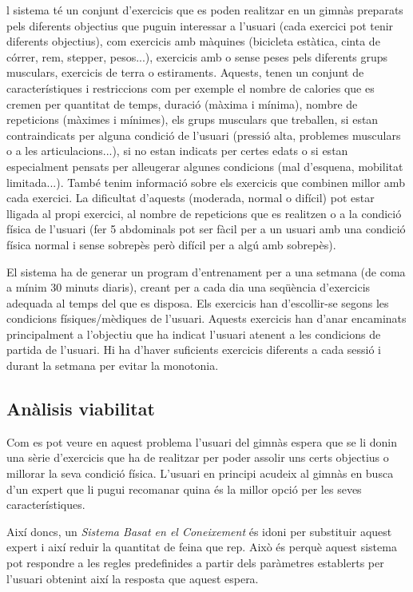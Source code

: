\documentclass[a4paper, 12pt]{article}
\begin{document}
l sistema té un conjunt d'exercicis que es poden realitzar en un gimnàs preparats pels diferents objectius que puguin interessar a l'usuari (cada exercici pot tenir diferents objectius), com exercicis amb màquines (bicicleta estàtica, cinta de córrer, rem, stepper, pesos...), exercicis amb o sense peses pels diferents grups musculars, exercicis de terra o estiraments.
Aquests, tenen un conjunt de característiques i restriccions com per exemple el nombre de calories que es cremen per quantitat de temps, duració (màxima i mínima), nombre de repeticions (màximes i mínimes), els grups musculars que treballen, si estan contraindicats per alguna condició de l'usuari (pressió alta, problemes musculars o a les articulacions...), si no estan indicats per certes edats o si estan especialment pensats per alleugerar algunes condicions (mal d'esquena, mobilitat limitada...). També tenim informació sobre els exercicis que combinen millor amb cada exercici. La dificultat d'aquests (moderada, normal o difícil) pot estar lligada al propi exercici, al nombre de repeticions que es realitzen o a la condició física de l'usuari (fer 5 abdominals pot ser fàcil per a un usuari amb una condició física normal i sense sobrepès però difícil per a algú amb sobrepès).

El sistema ha de generar un program d'entrenament per a una setmana (de coma a mínim 30 minuts diaris), creant per a cada dia una seqüència d'exercicis adequada al temps del que es disposa. Els exercicis han d'escollir-se segons les condicions físiques/mèdiques de l'usuari. Aquests exercicis han d'anar encaminats principalment a l'objectiu que ha indicat l'usuari atenent a les condicions de partida de l'usuari. Hi ha d'haver suficients exercicis diferents a cada sessió i durant la setmana per evitar la monotonia. 

\subsection{Anàlisis viabilitat}
Com es pot veure en aquest problema l'usuari del gimnàs espera que se li donin una sèrie d'exercicis que ha de realitzar per poder assolir uns certs objectius o millorar la seva condició física. L'usuari en principi acudeix al gimnàs en busca d'un expert que li pugui recomanar quina és la millor opció per les seves característiques.

Així doncs, un \emph{Sistema Basat en el Coneixement} és idoni per substituir aquest expert i així reduir la quantitat de feina que rep. Això és perquè aquest sistema pot respondre a les regles predefinides a partir dels paràmetres establerts per l'usuari obtenint així la resposta que aquest espera.
\end{document}
